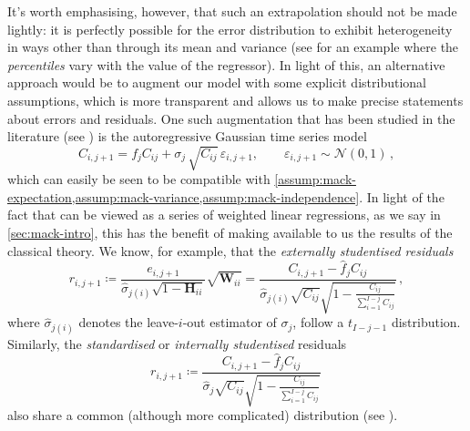 \documentclass[a4paper]{book}
\begin{document}
It's worth emphasising, however, that such an extrapolation should not be made lightly: it is perfectly possible for the error distribution to exhibit heterogeneity in ways other than through its mean and variance (see \cite[114]{efron:intro} for an example where the \emph{percentiles} vary with the value of the regressor). In light of this, an alternative approach would be to augment our model with some explicit distributional assumptions, which is more transparent and allows us to make precise statements about errors and residuals. One such augmentation that has been studied in the literature (see \cite[49]{wuthrich:stochastic-reserving}) is the autoregressive Gaussian time series model
\begin{equation} \label{eq:time-series-model}
  C_{i, j + 1} = f_j C_{ij} + \sigma_j \, \sqrt{C_{ij}} \, \varepsilon_{i, j + 1}, \qquad \varepsilon_{i, j + 1} \sim \mathcal{N}(0, 1) \,,
\end{equation}
which can easily be seen to be compatible with \cref{assump:mack-expectation,assump:mack-variance,assump:mack-independence}. In light of the fact that  can be viewed as a series of weighted linear regressions, as we say in \cref{sec:mack-intro}, this has the benefit of making available to us the results of the classical theory. We know, for example, that the \emph{externally studentised residuals}
\begin{equation}
  r_{i, j + 1}
  \coloneqq \frac{e_{i, j + 1}}{\widehat{\sigma}_{j (i)} \sqrt{1 - \mathbf{H}_{ii}}} \sqrt{\mathbf{W}_{ii}}
  = \frac{C_{i, j + 1} - \widehat{f}_j C_{ij}}{\widehat{\sigma}_{j (i)} \sqrt{C_{ij}} \sqrt{1 - \frac{C_{ij}}{\sum_{i = 1}^{I - j} C_{ij}}}} \,,
\end{equation}
where $\widehat{\sigma}_{j (i)}$ denotes the leave-$i$-out estimator of $\sigma_j$, follow a $t_{I - j - 1}$ distribution. Similarly, the \emph{standardised} or \emph{internally studentised} residuals
\begin{equation}
  r_{i, j + 1} \coloneqq \frac{C_{i, j + 1} - \widehat{f}_j C_{ij}}{\widehat{\sigma}_j \sqrt{C_{ij}} \sqrt{1 - \frac{C_{ij}}{\sum_{i = 1}^{I - j} C_{ij}}}} \,
\end{equation}
also share a common (although more complicated) distribution (see \cite[267 \psqq]{seber}).
\end{document}

